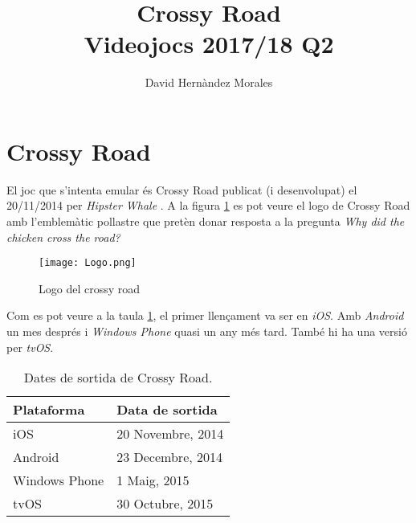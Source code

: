 \documentclass{article}
\title{Crossy Road \\
		\large Videojocs 2017/18 Q2}
\author{David Hernàndez Morales}
\begin{document}
\maketitle
\newpage
{}
\section{Crossy Road}
El joc que s'intenta emular és Crossy Road \textsuperscript{\texttrademark}
publicat (i desenvolupat) el 20/11/2014 per \textit{Hipster Whale} \cite{webCrossy}
\cite{wikipediaCrossy}. A la figura \ref{logo} es pot veure el logo de Crossy Road 
amb l'emblemàtic pollastre que pretèn donar resposta a la pregunta 
\textit{Why did the chicken cross the road?} \cite{preguntaChicken} 

\begin{figure}[h!]
	\texttt{[image: Logo.png]}
	\caption{Logo del crossy road}
	\label{logo}
\end{figure}

Com es pot veure a la taula \ref{dadesSortida}, el primer llençament va ser en
\textit{iOS}. Amb \textit{Android} un mes després i \textit{Windows Phone}
quasi un any més tard. També hi ha una versió per \textit{tvOS}.

\begin{table}[h!]
	\begin{center}		
		\label{dadesSortida}
		\begin{tabular}{l|l}
		\textbf{Plataforma} & \textbf{Data de sortida} \\
		\hline
		iOS & 20 Novembre, 2014 \\
		Android & 23 Decembre, 2014 \\
		Windows Phone & 1 Maig, 2015 \\
		tvOS & 30 Octubre, 2015		
		\end{tabular}
		\caption{Dates de sortida de Crossy Road.}
	\end{center}
\end{table}



\end{document}
